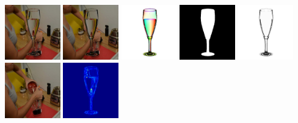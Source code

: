     \\
    \includegraphics[width=0.18\textwidth]{ch-tomnet/images/Synth/synthetic_63_shape25__0000_COCO_val2014_000000408989_tar.jpg}
    \includegraphics[width=0.18\textwidth]{ch-tomnet/images/Synth/synthetic_63_shape25__0000_COCO_val2014_000000408989_pred.jpg}
    \includegraphics[width=0.18\textwidth]{ch-tomnet/images/Synth/synthetic_63_shape_000000408989_gt_fcolor.jpg}
    \includegraphics[width=0.18\textwidth]{ch-tomnet/images/Synth/synthetic_63_shape_000000408989_gt_mask}
    \includegraphics[width=0.18\textwidth]{ch-tomnet/images/Synth/synthetic_63_shape_000000408989_gt_rho}
    \\
    \includegraphics[width=0.18\textwidth]{ch-tomnet/images/Synth/synthetic_63_shape25__0000_COCO_val2014_000000408989_ref.jpg}
    \includegraphics[width=0.18\textwidth]{ch-tomnet/images/Synth/synthetic_63_shape_000000408989_PSNR_29.23_SSIM_0.941_diff.png}
